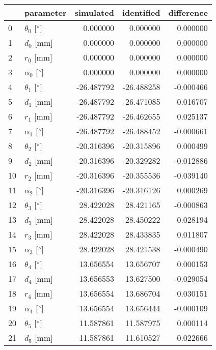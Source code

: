 \documentclass{standalone}%
\begin{document}
%
\normalsize%
\begin{tabular}{llrrr}
\toprule
{} &                 parameter &  simulated & identified & difference \\
\midrule
0  &  $\theta_{0}$ [$\degree$] &   0.000000 &   0.000000 &   0.000000 \\
1  &              $d_{0}$ [mm] &   0.000000 &   0.000000 &   0.000000 \\
2  &              $r_{0}$ [mm] &   0.000000 &   0.000000 &   0.000000 \\
3  &  $\alpha_{0}$ [$\degree$] &   0.000000 &   0.000000 &   0.000000 \\
4  &  $\theta_{1}$ [$\degree$] & -26.487792 & -26.488258 &  -0.000466 \\
5  &              $d_{1}$ [mm] & -26.487792 & -26.471085 &   0.016707 \\
6  &              $r_{1}$ [mm] & -26.487792 & -26.462655 &   0.025137 \\
7  &  $\alpha_{1}$ [$\degree$] & -26.487792 & -26.488452 &  -0.000661 \\
8  &  $\theta_{2}$ [$\degree$] & -20.316396 & -20.315896 &   0.000499 \\
9  &              $d_{2}$ [mm] & -20.316396 & -20.329282 &  -0.012886 \\
10 &              $r_{2}$ [mm] & -20.316396 & -20.355536 &  -0.039140 \\
11 &  $\alpha_{2}$ [$\degree$] & -20.316396 & -20.316126 &   0.000269 \\
12 &  $\theta_{3}$ [$\degree$] &  28.422028 &  28.421165 &  -0.000863 \\
13 &              $d_{3}$ [mm] &  28.422028 &  28.450222 &   0.028194 \\
14 &              $r_{3}$ [mm] &  28.422028 &  28.433835 &   0.011807 \\
15 &  $\alpha_{3}$ [$\degree$] &  28.422028 &  28.421538 &  -0.000490 \\
16 &  $\theta_{4}$ [$\degree$] &  13.656554 &  13.656707 &   0.000153 \\
17 &              $d_{4}$ [mm] &  13.656553 &  13.627500 &  -0.029054 \\
18 &              $r_{4}$ [mm] &  13.656554 &  13.686704 &   0.030151 \\
19 &  $\alpha_{4}$ [$\degree$] &  13.656554 &  13.656444 &  -0.000109 \\
20 &  $\theta_{5}$ [$\degree$] &  11.587861 &  11.587975 &   0.000114 \\
21 &              $d_{5}$ [mm] &  11.587861 &  11.610527 &   0.022666 \\

\end{tabular}
\end{document}
